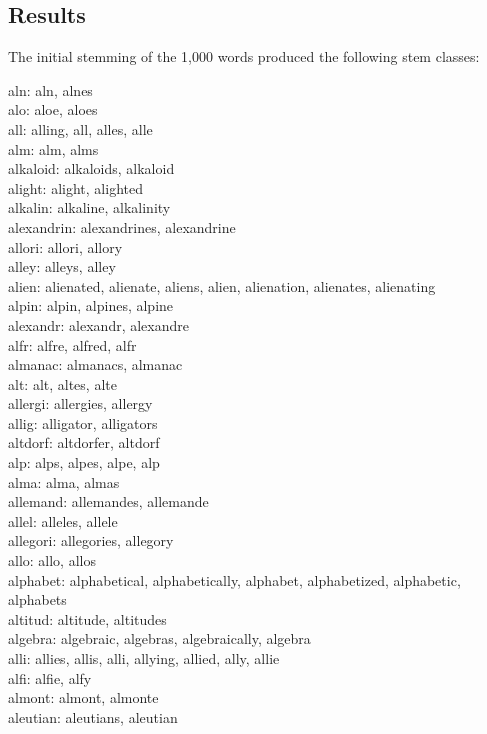 \documentclass[10pt,letterpaper,bibliography=totoc]{scrartcl}
\begin{document}
\subsection{Results}
The initial stemming of the 1,000 words produced the following stem classes:

\noindent
aln: aln, alnes\\
alo: aloe, aloes\\
all: alling, all, alles, alle\\
alm: alm, alms\\
alkaloid: alkaloids, alkaloid\\
alight: alight, alighted\\
alkalin: alkaline, alkalinity\\
alexandrin: alexandrines, alexandrine\\
allori: allori, allory\\
alley: alleys, alley\\
alien: alienated, alienate, aliens, alien, alienation, alienates, alienating\\
alpin: alpin, alpines, alpine\\
alexandr: alexandr, alexandre\\
alfr: alfre, alfred, alfr\\
almanac: almanacs, almanac\\
alt: alt, altes, alte\\
allergi: allergies, allergy\\
allig: alligator, alligators\\
altdorf: altdorfer, altdorf\\
alp: alps, alpes, alpe, alp\\
alma: alma, almas\\
allemand: allemandes, allemande\\
allel: alleles, allele\\
allegori: allegories, allegory\\
allo: allo, allos\\
alphabet: alphabetical, alphabetically, alphabet, alphabetized, alphabetic, alphabets\\
altitud: altitude, altitudes\\
algebra: algebraic, algebras, algebraically, algebra\\
alli: allies, allis, alli, allying, allied, ally, allie\\
alfi: alfie, alfy\\
almont: almont, almonte\\
aleutian: aleutians, aleutian\\
\end{document}
